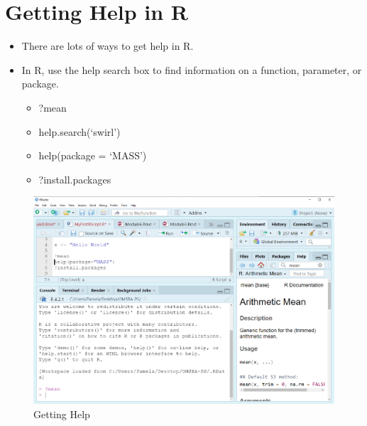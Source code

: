 \documentclass[
  letterpaper,
  DIV=11,
  numbers=noendperiod]{scrreprt}
\providecommand{\tightlist}{%
  \setlength{\itemsep}{0pt}\setlength{\parskip}{0pt}}\usepackage{longtable,booktabs,array}
\begin{document}
\section{Getting Help in R}\label{getting-help-in-r}

\begin{itemize}
\tightlist
\item
  There are lots of ways to get help in R.
\item
  In R, use the help search box to find information on a function,
  parameter, or package.

  \begin{itemize}
  \tightlist
  \item
    ?mean
  \item
    help.search(`swirl')
  \item
    help(package = `MASS')
  \item
    ?install.packages
  \end{itemize}
\end{itemize}

\begin{figure}[H]

{\centering \includegraphics{Pictures/Ch0/Help.png}

}

\caption{Getting Help}

\end{figure}%
\end{document}
